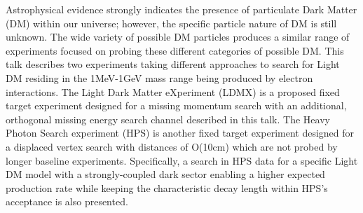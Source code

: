 Astrophysical evidence strongly indicates the presence of particulate Dark Matter (DM) within our universe; however, the specific particle nature of DM is still unknown. The wide variety of possible DM particles produces a similar range of experiments focused on probing these different categories of possible DM. This talk describes two experiments taking different approaches to search for Light DM residing in the 1MeV-1GeV mass range being produced by electron interactions. The Light Dark Matter eXperiment (LDMX) is a proposed fixed target experiment designed for a missing momentum search with an additional, orthogonal missing energy search channel described in this talk. The Heavy Photon Search experiment (HPS) is another fixed target experiment designed for a displaced vertex search with distances of O(10cm) which are not probed by longer baseline experiments. Specifically, a search in HPS data for a specific Light DM model with a strongly-coupled dark sector enabling a higher expected production rate while keeping the characteristic decay length within HPS's acceptance is also presented.
